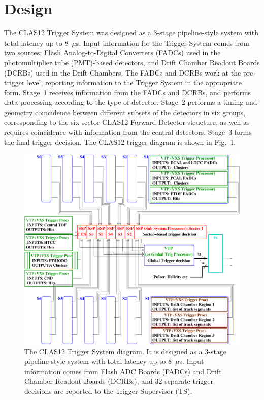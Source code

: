 \section{Design}

The CLAS12 Trigger System was designed as a 3-stage pipeline-style system with total latency up to
8~$\mu$s. Input information for the Trigger System comes from two sources:  Flash Analog-to-Digital
Converters (FADCs) used in the photomultiplier tube (PMT)-based detectors, and Drift Chamber Readout
Boards (DCRBs) used in the Drift Chambers. The FADCs and DCRBs work at the pre-trigger level, reporting
information to the Trigger System in the appropriate form. Stage~1 receives information from the FADCs
and DCRBs, and performs data processing according to the type of detector. Stage~2 performs a timing and
geometry coincidence between different subsets of the detectors in six groups, corresponding to the
six-sector CLAS12 Forward Detector structure, as well as requires coincidence with information from the
central detectors. Stage~3 forms the final trigger decision. The CLAS12 trigger diagram is shown in
Fig.~\ref{fig:TriggerDiagram}.

\begin{figure}[hbt]
	\centering
	\includegraphics[width=1.5\columnwidth,height=0.4\textheight]{img/CLAS12_TRIGGER_1.pdf}
	\caption{The CLAS12 Trigger System diagram. It is designed as a 3-stage pipeline-style system with
          total latency up to 8~$\mu$s. Input information comes from Flash ADC Boards (FADCs) and Drift
          Chamber Readout Boards (DCRBs), and 32 separate trigger decisions are reported to the Trigger
          Supervisor (TS).}
	\label{fig:TriggerDiagram}
\end{figure}


